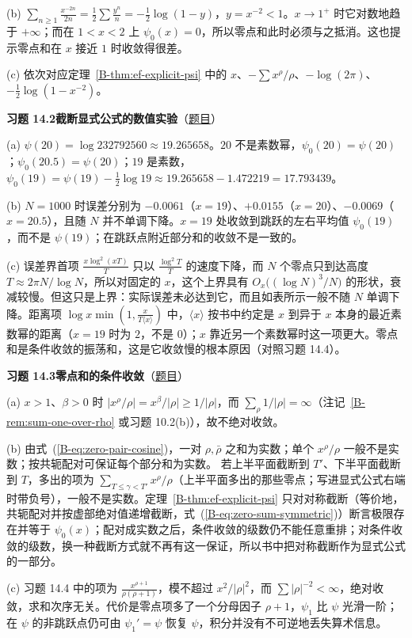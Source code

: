 \documentclass[11pt,a4paper]{article}
\newcommand{\bref}[1]{\ref*{B-#1}}
\newcommand{\Sol}[2]{%
  \par\addvspace{1.2em}\noindent
  \hypertarget{s:#1}{}\textbf{习题 #1\quad #2}\hfill{\small（\hyperlink{q:#1}{题目}）}\par
  \nopagebreak\smallskip}
\begin{document}
(b) $\sum_{n\ge1}\frac{x^{-2n}}{2n}=\frac12\sum\frac{y^n}n=-\frac12\log(1-y)$，$y=x^{-2}<1$。$x\to1^+$ 时它对数地趋于 $+\infty$；而在 $1<x<2$ 上 $\psi_0(x)=0$，所以零点和此时必须与之抵消。这也提示零点和在 $x$ 接近 $1$ 时收敛得很差。

(c) 依次对应定理~\bref{thm:ef-explicit-psi} 中的 $x$、$-\sum x^\rho/\rho$、$-\log(2\pi)$、$-\frac12\log(1-x^{-2})$。

\Sol{14.2}{截断显式公式的数值实验}
(a) $\psi(20)=\log232792560\approx19.265658$。$20$ 不是素数幂，$\psi_0(20)=\psi(20)$；$\psi_0(20.5)=\psi(20)$；$19$ 是素数，$\psi_0(19)=\psi(19)-\frac12\log19\approx19.265658-1.472219=17.793439$。

(b) $N=1000$ 时误差分别为 $-0.0061$（$x=19$）、$+0.0155$（$x=20$）、$-0.0069$（$x=20.5$），且随 $N$ 并不单调下降。$x=19$ 处收敛到跳跃的左右平均值 $\psi_0(19)$，而不是 $\psi(19)$；在跳跃点附近部分和的收敛不是一致的。

(c) 误差界首项 $\frac{x\log^2(xT)}T$ 只以 $\frac{\log^2T}T$ 的速度下降，而 $N$ 个零点只到达高度 $T\approx2\pi N/\log N$，所以对固定的 $x$，这个上界具有 $O_x\bigl((\log N)^3/N\bigr)$ 的形状，衰减较慢。但这只是上界：实际误差未必达到它，而且如表所示一般不随 $N$ 单调下降。距离项 $\log x\min(1,\frac x{T\langle x\rangle})$ 中，$\langle x\rangle$ 按书中约定是 $x$ 到异于 $x$ 本身的最近素数幂的距离（$x=19$ 时为 $2$，不是 $0$）；$x$ 靠近另一个素数幂时这一项更大。零点和是条件收敛的振荡和，这是它收敛慢的根本原因（对照习题 14.4）。

\Sol{14.3}{零点和的条件收敛}
(a) $x>1$、$\beta>0$ 时 $|x^\rho/\rho|=x^\beta/|\rho|\ge1/|\rho|$，而 $\sum_\rho1/|\rho|=\infty$（注记~\bref{rem:sum-one-over-rho} 或习题 10.2(b)），故不绝对收敛。

(b) 由式~(\bref{eq:zero-pair-cosine})，一对 $\rho,\bar\rho$ 之和为实数；单个 $x^\rho/\rho$ 一般不是实数；按共轭配对可保证每个部分和为实数。
若上半平面截断到 $T'$、下半平面截断到 $T$，多出的项为 $\sum_{T\le\gamma<T'}x^{\rho}/\rho$（上半平面多出的那些零点；写进显式公式右端时带负号），一般不是实数。定理~\bref{thm:ef-explicit-psi} 只对对称截断（等价地，共轭配对并按虚部绝对值递增截断，式~(\bref{eq:zero-sum-symmetric})）断言极限存在并等于 $\psi_0(x)$；配对成实数之后，条件收敛的级数仍不能任意重排；对条件收敛的级数，换一种截断方式就不再有这一保证，所以书中把对称截断作为显式公式的一部分。

(c) 习题 14.4 中的项为 $\frac{x^{\rho+1}}{\rho(\rho+1)}$，模不超过 $x^2/|\rho|^2$，而 $\sum|\rho|^{-2}<\infty$，绝对收敛，求和次序无关。代价是零点项多了一个分母因子 $\rho+1$，$\psi_1$ 比 $\psi$ 光滑一阶；在 $\psi$ 的非跳跃点仍可由 $\psi_1'=\psi$ 恢复 $\psi$，积分并没有不可逆地丢失算术信息。
\end{document}
